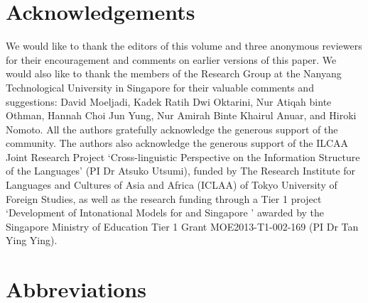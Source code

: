\documentclass[output=paper
,modfonts
,nonflat]{langsci/langscibook}
\begin{document}
\section*{Acknowledgements}
We would like to thank the editors of this volume and three anonymous reviewers for their encouragement and comments on earlier versions of this paper. We would also like to thank the members of the  Research Group at the Nanyang Technological University in Singapore for their valuable comments and suggestions: David Moeljadi, Kadek Ratih Dwi Oktarini, Nur Atiqah binte Othman, Hannah Choi Jun Yung, Nur Amirah Binte Khairul Anuar, and Hiroki Nomoto. All the authors gratefully acknowledge the generous support of the   community. The authors also acknowledge the generous support of the ILCAA Joint Research Project `Cross-linguistic Perspective on the Information Structure of the  Languages' (PI Dr Atsuko Utsumi), funded by The Research Institute for Languages and Cultures of Asia and Africa (ICLAA) of Tokyo University of Foreign Studies, as well as the research funding through a Tier 1 project `Development of Intonational Models for  and Singapore ' awarded by the Singapore Ministry of Education Tier 1 Grant MOE2013-T1-002-169 (PI Dr Tan Ying Ying). 

\newpage
\section*{Abbreviations}
\end{document}
